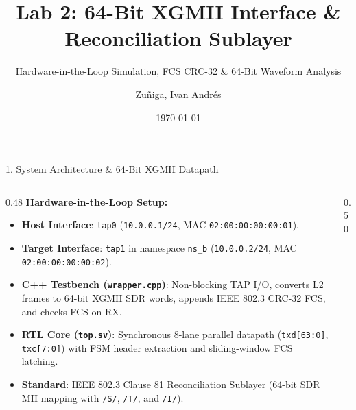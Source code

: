 \documentclass[aspectratio=169, 10pt]{beamer}
\title{Lab 2: 64-Bit XGMII Interface \& Reconciliation Sublayer}
\subtitle{Hardware-in-the-Loop Simulation, FCS CRC-32 \& 64-Bit Waveform Analysis}
\date{\today}
\author{Zuñiga, Ivan Andrés}
\institute{Fundación Fulgor}
\begin{document}
\maketitle

\begin{frame}{1. System Architecture \& 64-Bit XGMII Datapath}
\vspace{1mm}
\begin{columns}[c]
    \begin{column}{0.48\textwidth}
        \textbf{Hardware-in-the-Loop Setup:}
        \begin{itemize}\small
            \item \textbf{Host Interface}: \texttt{tap0} (\texttt{10.0.0.1/24}, MAC \texttt{02:00:00:00:00:01}).
            \item \textbf{Target Interface}: \texttt{tap1} in namespace \texttt{ns\_b} (\texttt{10.0.0.2/24}, MAC \texttt{02:00:00:00:00:02}).
            \item \textbf{C++ Testbench (\texttt{wrapper.cpp})}: Non-blocking TAP I/O, converts L2 frames to 64-bit XGMII SDR words, appends IEEE 802.3 CRC-32 FCS, and checks FCS on RX.
            \item \textbf{RTL Core (\texttt{top.sv})}: Synchronous 8-lane parallel datapath (\texttt{txd[63:0]}, \texttt{txc[7:0]}) with FSM header extraction and sliding-window FCS latching.
            \item \textbf{Standard}: IEEE 802.3 Clause 81 Reconciliation Sublayer (64-bit SDR MII mapping with \texttt{/S/}, \texttt{/T/}, and \texttt{/I/}).
        \end{itemize}
    \end{column}
    
    \begin{column}{0.50\textwidth}
        \begin{tcolorbox}[colback=BgSlate, colframe=PrimaryBlue, title=\footnotesize 64-Bit XGMII Simulation Architecture, arc=2mm, top=1.5mm, bottom=1.5mm]
            \centering
\end{tcolorbox}
\end{column}
\end{columns}
\end{frame}
\end{document}
